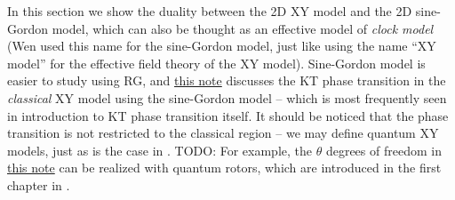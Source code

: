 \documentclass[hyperref, a4paper]{article}
\newcommand{\ktnote}{\href{../topological-phases-reading-notes/kt.pdf}{this note}}
\begin{document}
In this section we show the duality between the 2D XY model and the 2D sine-Gordon model, which can also 
be thought as an effective model of \emph{clock model} (Wen used this name for the sine-Gordon model, just 
like using the name ``XY model'' for the effective field theory of the XY model). 
Sine-Gordon model is easier to study using RG, and \ktnote{} discusses the KT phase transition in the 
\emph{classical} XY model using the sine-Gordon model -- which is most frequently 
seen in introduction to KT phase transition itself. It should be noticed that the 
phase transition is not restricted to the classical region -- we may define quantum XY models, just as
is the case in . 
TODO: For example, the $\theta$ degrees of freedom in \ktnote{} can be realized with quantum rotors, which are 
introduced in the first chapter in \cite{Sachdev2009}. 
\end{document}
